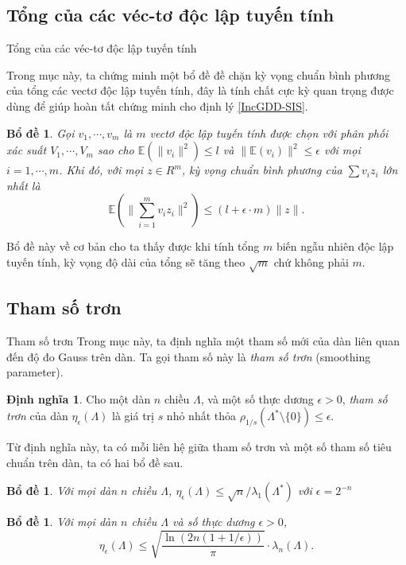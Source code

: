 \documentclass[notheorems,envcountsect,serif,12pt]{beamer}
\providecommand{\norm}[1]{\lVert#1\rVert}
\newcommand{\E}{\mathbb{E}}
\numberwithin{equation}{section}
\newtheorem{lemma}[theorem]{Bổ đề}
\theoremstyle{definition}
\newtheorem{definition}[theorem]{Định nghĩa}
\numberwithin{equation}{section}
\begin{document}
\subsection{Tổng của các véc-tơ độc lập tuyến tính}
\begin{frame}{Tổng của các véc-tơ độc lập tuyến tính}

Trong mục này, ta chứng minh một bổ đề đề chặn kỳ vọng chuẩn bình phương của tổng các vectơ độc lập tuyến tính, đây là tính chất cực kỳ quan trọng được dùng để giúp hoàn tất chứng minh cho định lý \ref{IncGDD-SIS}.\pause
	\begin{lemma}\label{TDLTT}
		Gọi $v_1, \cdots, v_m$ là $m$ vectơ độc lập tuyến tính được chọn với phân phối xác suất $V_1, \cdots, V_m$ sao cho $\E\left(\norm{v_i}^2\right)\le l$ và $\norm{\E(v_i)}^2\le \epsilon$ với mọi $i=1,\cdots,m$. Khi đó, với mọi $z\in R^m$, kỳ vọng chuẩn bình phương của $\sum v_iz_i$ lớn nhất là $$\E\left(\norm{\sum_{i=1}^{m}v_iz_i}^2\right)\le (l+\epsilon\cdot m)\norm{z}.$$
	\end{lemma}\pause
	Bổ đề này về cơ bản cho ta thấy được khi tính tổng $m$ biến ngẫu nhiên độc lập tuyến tính, kỳ vọng độ dài của tổng sẽ tăng theo $\sqrt{m}$ chứ không phải $m$.
\end{frame}
\subsection{Tham số trơn}\label{TST}
\begin{frame}{Tham số trơn}
	Trong mục này, ta định nghĩa một tham số mới của dàn liên quan đến độ đo Gauss trên dàn. Ta gọi tham số này là \textit{tham số trơn} (smoothing parameter).\pause
	\begin{definition}
		Cho một dàn $n$ chiều $\Lambda $, và một số thực dương $\epsilon >0$, \textit{tham số trơn} của dàn $\eta_\epsilon(\Lambda)$ là giá trị $s$ nhỏ nhất thỏa $\rho_{1/s}\left(\Lambda^*\setminus\{0\}\right)\le \epsilon$.
	\end{definition}\pause
	Từ định nghĩa này, ta có mỗi liên hệ giữa tham số trơn và một số tham số tiêu chuẩn trên dàn, ta có hai bổ đề sau.\pause
	\begin{lemma}\label{TST_BD1}
			Với mọi dàn $n$ chiều $\Lambda$, $\eta_\epsilon(\Lambda)\le \sqrt{n}/\lambda_1(\Lambda^*)$ với $\epsilon=2^{-n}$
	\end{lemma}\pause
	\begin{lemma}\label{TST_BD2}
		Với mọi dàn $n$ chiều $\Lambda$ và số thực dương $\epsilon>0$, $$\eta_\epsilon(\Lambda)\le\sqrt{\frac{\ln(2n(1+1/\epsilon))}{\pi}}\cdot \lambda_n(\Lambda).$$
	\end{lemma}
\end{frame}
\end{document}
